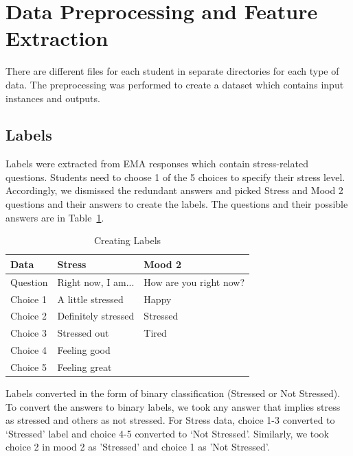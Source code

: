 \documentclass[12pt,oneandhalf,chaparabic,lfm,phd,eng,oneside,pntc]{gsufbe}
\begin{document}
\section{Data Preprocessing and Feature Extraction}
\label{sec:Preprocessing}
There are different files for each student in separate directories for each type of data. The preprocessing was performed to create a dataset which contains input instances and outputs. 

\subsection{Labels}
\label{subsec:Labels}
Labels were extracted from EMA responses which contain stress-related questions. Students need to choose 1 of the 5 choices to specify their stress level. Accordingly, we dismissed the redundant answers and picked Stress and Mood 2 questions and their answers to create the labels. The questions and their possible answers are in Table~\ref{tab:Creating Labels}.

\begin{table}[b!]
\centering
\caption{Creating Labels}
\label{tab:Creating Labels}
\begin{tabular}{|l|l|l|}
\hline
Data     & Stress              & Mood 2                 \\ \hline
Question & Right now, I am...  & How are you right now? \\
Choice 1 & A little stressed   & Happy                  \\
Choice 2 & Definitely stressed & Stressed               \\
Choice 3 & Stressed out        & Tired                  \\
Choice 4 & Feeling good        &                        \\
Choice 5 & Feeling great       &                        \\ \hline
\end{tabular}
\end{table}

Labels converted in the form of binary classification (Stressed or Not Stressed). To convert the answers to binary labels, we took any answer that implies stress as stressed and others as not stressed. For Stress data, choice 1-3 converted to ‘Stressed’ label and choice 4-5 converted to ‘Not Stressed’. Similarly, we took choice 2 in mood 2 as 'Stressed' and choice 1 as 'Not Stressed'.
\end{document}
